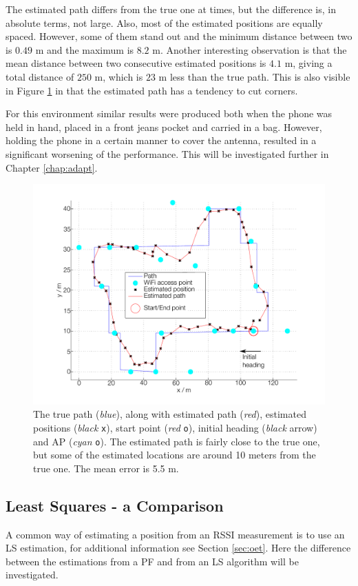 \documentclass{LTHthesis}
\begin{document}
The estimated path differs from the true one at times, but the difference is, in absolute terms, not large. Also, most of the estimated positions are equally spaced. However, some of them stand out and the minimum distance between two is $0.49$ m and the maximum is $8.2$ m. Another interesting observation is that the mean distance between two consecutive estimated positions is $4.1$ m, giving a total distance of $250$ m, which is $23$ m less than the true path. This is also visible in Figure \ref{true_vs_est_env_3} in that the estimated path has a tendency to cut corners.

For this environment similar results were produced both when the phone was held in hand, placed in a front jeans pocket and carried in a bag. However, holding the phone in a certain manner to cover the antenna, resulted in a significant worsening of the performance. This will be investigated further in Chapter \ref{chap:adapt}.        
%
\begin{figure}[!hbt]

\includegraphics[width=1\textwidth ]{images/pure_rssi/true_vs_est_env_3}
\caption{The true path (\emph{blue}), along with estimated path (\emph{red}), estimated positions (\emph{black} \texttt{x}), start point (\emph{red} \texttt{o}), initial heading (\emph{black} arrow) and AP (\emph{cyan} \texttt{o}). The estimated path is fairly close to the true one, but some of the estimated locations are around 10 meters from the true one. The  mean error is 5.5 m.}\label{true_vs_est_env_3}
\end{figure}
%
\subsection{Least Squares - a Comparison}
%
A common way of estimating a position from an RSSI measurement is to use an LS estimation, for additional information see Section \ref{sec:oet}. Here the difference between the estimations from a PF and from an LS algorithm will be investigated. 
\end{document}
